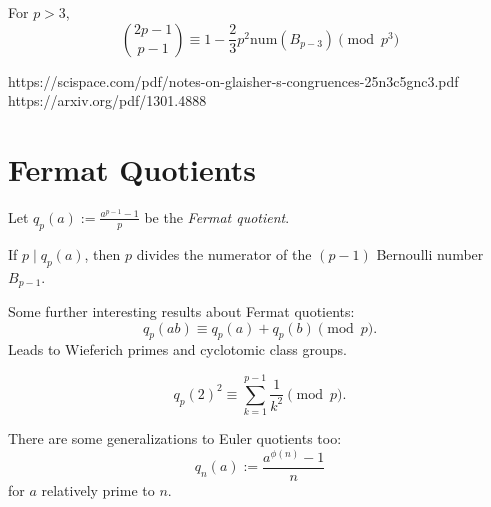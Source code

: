 \begin{theorem}
  For $p>3$,
  \begin{equation*}
    \binom{2p-1}{p-1}\equiv 1-\frac{2}{3}p^2 \mathrm{num}(B_{p-3})\pmod{p^3}
  \end{equation*}
\end{theorem}

https://scispace.com/pdf/notes-on-glaisher-s-congruences-25n3c5gnc3.pdf \\
https://arxiv.org/pdf/1301.4888

\section{Fermat Quotients}

Let $q_p(a):= \frac{a^{p-1}-1}{p}$ be the \emph{Fermat quotient}.

\begin{theorem}
  If $p\mid q_p(a)$, then $p$ divides the numerator of the $(p-1)$\supth{} Bernoulli number $B_{p-1}$.
\end{theorem}

Some further interesting results about Fermat quotients:
\begin{equation*}
  q_p(ab)\equiv q_p(a)+q_p(b)\pmod{p}.
\end{equation*}
Leads to Wieferich primes and cyclotomic class groups.

\begin{theorem}
  \begin{equation*}
    q_p(2)^2\equiv \sum_{k=1}^{p-1}\frac{1}{k^2}\pmod{p}.
  \end{equation*}
\end{theorem}

There are some generalizations to Euler quotients too:
\begin{equation*}
  q_n(a):=\frac{a^{\phi(n)}-1}{n}
\end{equation*}
for $a$ relatively prime to $n$.

